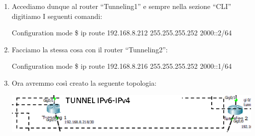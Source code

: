 \begin{enumerate}
    \item Accediamo dunque al router “Tunneling1” e sempre nella sezione “CLI” digitiamo I seguenti comandi:\par
    \begin{fcmds}{Configuration mode}
        \$ ip route 192.168.8.212 255.255.255.252 2000::2/64
    \end{fcmds}
    \item Facciamo la stessa cosa con il router “Tunneling2”:\par
    \begin{fcmds}{Configuration mode}
        \$ ip route 192.168.8.216 255.255.255.252 2000::1/64
    \end{fcmds}
    \item Ora avremmo così creato la seguente topologia:\par
    \begin{center}
        \includegraphics[width=\linewidth]{images/07.routing-sicurezza/tunneling/11.png}
    \end{center}
\end{enumerate}
